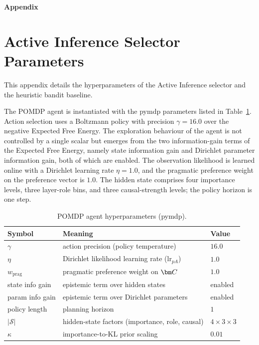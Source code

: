 
\begin{center}
  {\Large\bfseries Appendix\par}
\end{center}
\vspace{0.5em}

\section{Active Inference Selector Parameters}
\label{app:selector}

This appendix details the hyperparameters of the Active Inference
selector and the heuristic bandit baseline.

The POMDP agent is instantiated with the pymdp parameters listed in
Table~\ref{tab:hparams}. Action selection uses a Boltzmann policy with
precision $\gamma = 16.0$ over the negative Expected Free Energy. The
exploration behaviour of the agent is not controlled by a single scalar
but emerges from the two information-gain terms of the Expected Free
Energy, namely state information gain and Dirichlet parameter
information gain, both of which are enabled. The observation likelihood
is learned online with a Dirichlet learning rate $\eta = 1.0$, and the
pragmatic preference weight on the preference vector is $1.0$. The
hidden state comprises four importance levels, three layer-role bins,
and three causal-strength levels; the policy horizon is one step.

\begin{table}[t]
\centering
\caption{POMDP agent hyperparameters (pymdp).}
\label{tab:hparams}
\small
\begin{tabular}{lll}
\toprule
Symbol & Meaning & Value \\
\midrule
$\gamma$ & action precision (policy temperature) & $16.0$ \\
$\eta$ & Dirichlet likelihood learning rate ($\mathrm{lr}_{pA}$) & $1.0$ \\
$w_{\text{prag}}$ & pragmatic preference weight on $\vect{C}$ & $1.0$ \\
state info gain & epistemic term over hidden states & enabled \\
param info gain & epistemic term over Dirichlet parameters & enabled \\
policy length & planning horizon & $1$ \\
$|\mathcal{S}|$ & hidden-state factors (importance, role, causal) & $4\times3\times3$ \\
$\kappa$ & importance-to-KL prior scaling & $0.01$ \\
\bottomrule
\end{tabular}
\end{table}

